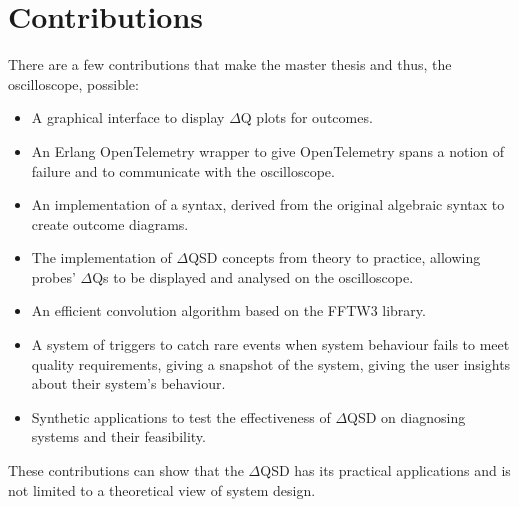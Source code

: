 \section{Contributions}
    There are a few contributions that make the master thesis and thus, the oscilloscope, possible:
    \begin{itemize}
        \item A graphical interface to display $\Delta$Q plots for outcomes.
        \item An Erlang OpenTelemetry wrapper to give OpenTelemetry spans a notion of failure and to communicate with the oscilloscope.
        \item An implementation of a syntax, derived from the original algebraic syntax to create outcome diagrams. 
        \item The implementation of $\Delta$QSD concepts from theory to practice, allowing probes' $\Delta$Qs to be displayed and analysed on the oscilloscope.
        \item An efficient convolution algorithm based on the FFTW3 library.
        \item A system of triggers to catch rare events when system behaviour fails to meet quality requirements, giving a snapshot of the system, giving the user insights about their system's behaviour.
        \item Synthetic applications to test the effectiveness of $\Delta$QSD on diagnosing systems and their feasibility.
    \end{itemize}
    These contributions can show that the $\Delta$QSD has its practical applications and is not limited to a theoretical view of system design.

